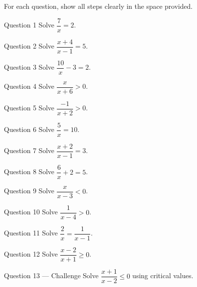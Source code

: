 \documentclass[11pt]{article}
\begin{document}
\clearpage
{}
For each question, show all steps clearly in the space provided.

\begin{qbox}{Question 1}
Solve $\dfrac7x=2$.\workspace{2.4cm}
\end{qbox}

\begin{qbox}{Question 2}
Solve $\dfrac{x+4}{x-1}=5$.\workspace{2.4cm}
\end{qbox}

\begin{qbox}{Question 3}
Solve $\dfrac{10}x-3=2$.\workspace{2.4cm}
\end{qbox}

\begin{qbox}{Question 4}
Solve $\dfrac{x}{x+6}>0$.\workspace{2.4cm}
\end{qbox}

\begin{qbox}{Question 5}
Solve $\dfrac{-1}{x+2}>0$.\workspace{2.4cm}
\end{qbox}

\begin{qbox}{Question 6}
Solve $\dfrac5x=10$.\workspace{2.4cm}
\end{qbox}

\begin{qbox}{Question 7}
Solve $\dfrac{x+2}{x-1}=3$.\workspace{2.4cm}
\end{qbox}

\begin{qbox}{Question 8}
Solve $\dfrac6x+2=5$.\workspace{2.4cm}
\end{qbox}

\begin{qbox}{Question 9}
Solve $\dfrac{x}{x-3}<0$.\workspace{2.4cm}
\end{qbox}

\begin{qbox}{Question 10}
Solve $\dfrac{1}{x-4}>0$.\workspace{2.4cm}
\end{qbox}

\begin{qbox}{Question 11}
Solve $\dfrac{2}{x}=\dfrac{1}{x-1}$.\workspace{2.4cm}
\end{qbox}

\begin{qbox}{Question 12}
Solve $\dfrac{x-2}{x+1}\ge0$.\workspace{2.4cm}
\end{qbox}

\begin{qbox}{Question 13 --- Challenge}
Solve $\dfrac{x+1}{x-2}\le0$ using critical values.\workspace{3.5cm}
\end{qbox}
\end{document}
